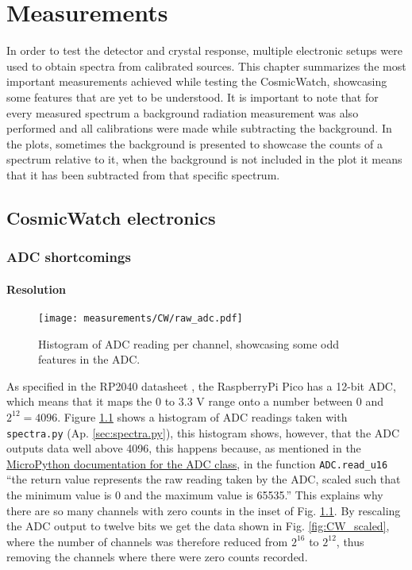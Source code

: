 \chapter{Measurements}\label{chap:measurements}

In order to test the detector and crystal response, multiple electronic setups were used to obtain spectra from calibrated sources. This chapter summarizes the most important measurements achieved while testing the CosmicWatch, showcasing some features that are yet to be understood. It is important to note that for every measured spectrum a background radiation measurement was also performed and all calibrations were made while subtracting the background. In the plots, sometimes the background is presented to showcase the counts of a spectrum relative to it, when the background is not included in the plot it means that it has been subtracted from that specific spectrum.

\section{CosmicWatch electronics}\label{sec:CW_measurements}

\subsection{ADC shortcomings}\label{sec:ADC_shortcomings}

\subsubsection{Resolution}

\begin{figure}
  \centering
  \texttt{[image: measurements/CW/raw\_adc.pdf]}
  \caption{\label{fig:CW_raw}Histogram of ADC reading per channel, showcasing some odd features in the ADC.}
\end{figure}

As specified in the RP2040 datasheet \cite[sec.~4.9]{datasheet2024rp2040}, the RaspberryPi Pico has a 12-bit ADC, which means that it maps the 0 to 3.3 \unit{\V} range onto a number between 0 and $2^{12}=4096$. Figure \ref{fig:CW_raw} shows a histogram of ADC readings taken with \texttt{spectra.py} (Ap. \ref{sec:spectra.py}), this histogram shows, however, that the ADC outputs data well above 4096, this happens because, as mentioned in the \href{https://docs.micropython.org/en/latest/library/machine.ADC.html#machine.ADC}{MicroPython documentation for the ADC class}, in the function \texttt{ADC.read\_u16} ``the return value represents the raw reading taken by the ADC, scaled such that the minimum value is 0 and the maximum value is 65535.'' This explains why there are so many channels with zero counts in the inset of Fig. \ref{fig:CW_raw}. By rescaling the ADC output to twelve bits we get the data shown in Fig. \ref{fig:CW_scaled}, where the number of channels was therefore reduced from $2^{16}$ to $2^{12}$, thus removing the channels where there were zero counts recorded.

